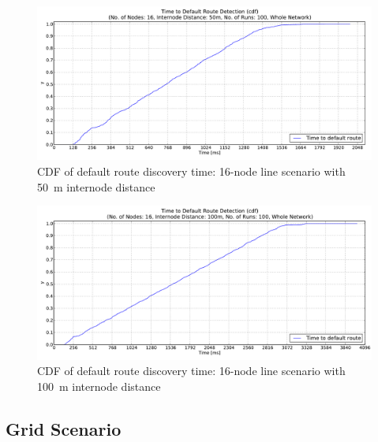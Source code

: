 \begin{figure}[htpb]
  \begin{center}
    \leavevmode
      \includegraphics[scale=0.38]
      {Pics/results/16/MRHOF/line/dist50_montecarlo_cdf_hist.pdf}
   \caption{CDF of default route discovery time: 16-node line scenario with 50~m internode distance}
   \label{fig:16_MRHOF_line_50_cdf}
  \end{center}
\end{figure}

\begin{figure}[htpb]
  \begin{center}
    \leavevmode
      \includegraphics[scale=0.38]
      {Pics/results/16/MRHOF/line/dist100_montecarlo_cdf_hist.pdf}
   \caption{CDF of default route discovery time: 16-node line scenario with 100~m internode distance}
   \label{fig:16_MRHOF_line_100_cdf}
    \vspace{6in}
  \end{center}
\end{figure}

\clearpage
\subsection{Grid Scenario}
\label{Appx:cdf:grid}

